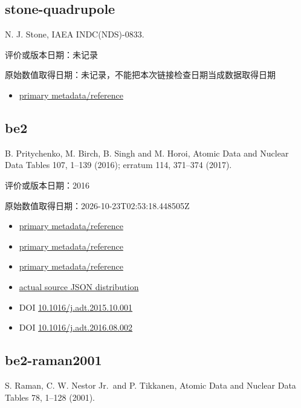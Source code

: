 \documentclass[
  11pt,
  letterpaper,
]{article}
\providecommand{\tightlist}{%
  \setlength{\itemsep}{0pt}\setlength{\parskip}{0pt}}
\begin{document}
\subsection{stone-quadrupole}\label{stone-quadrupole}

N. J. Stone, IAEA INDC(NDS)-0833.

评价或版本日期：未记录

原始数值取得日期：未记录，不能把本次链接检查日期当成数据取得日期

\begin{itemize}
\tightlist
\item
  \href{https://nds.iaea.org/records/xk3d8-tw250}{primary
  metadata/reference}
\end{itemize}

\subsection{be2}\label{be2}

B. Pritychenko, M. Birch, B. Singh and M. Horoi, Atomic Data and Nuclear
Data Tables 107, 1--139 (2016); erratum 114, 371--374 (2017).

评价或版本日期：2016

原始数值取得日期：2026-10-23T02:53:18.448505Z

\begin{itemize}
\tightlist
\item
  \href{https://www.nndc.bnl.gov/be2/}{primary metadata/reference}
\item
  \href{https://www.nndc.bnl.gov/be2/help.html}{primary
  metadata/reference}
\item
  \href{https://arxiv.org/abs/1312.5975}{primary metadata/reference}
\item
  \href{https://www.nndc.bnl.gov/be2/data/adopted-entries.json}{actual
  source JSON distribution}
\item
  DOI
  \href{https://doi.org/10.1016/j.adt.2015.10.001}{10.1016/j.adt.2015.10.001}
\item
  DOI
  \href{https://doi.org/10.1016/j.adt.2016.08.002}{10.1016/j.adt.2016.08.002}
\end{itemize}

\subsection{be2-raman2001}\label{be2-raman2001}

S. Raman, C. W. Nestor Jr.~and P. Tikkanen, Atomic Data and Nuclear Data
Tables 78, 1--128 (2001).
\end{document}

